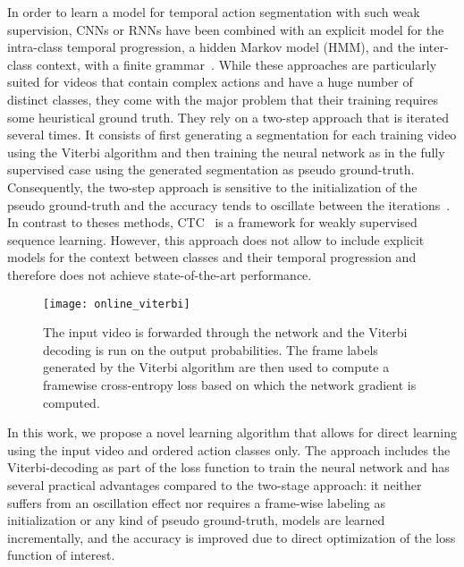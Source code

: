 \documentclass[10pt,twocolumn,letterpaper]{article}
\begin{document}
In order to learn a model for temporal action segmentation with such weak supervision, CNNs or RNNs have been combined 
with an explicit model for the intra-class temporal progression, \eg a hidden Markov model (HMM), and the
inter-class context, \eg with a finite grammar~\cite{richard2017weakly,koller2016deephand,koller2017resign}. While these approaches are particularly suited for videos that contain complex
actions and have a huge number of distinct classes, they come with the major problem
that their training requires some heuristical ground truth. They rely on a two-step approach that is iterated several times. It consists of first generating a segmentation for each training video using the Viterbi algorithm and then training the neural network as in the fully supervised case using the generated segmentation as pseudo ground-truth. Consequently, the two-step approach is sensitive to the initialization of the pseudo ground-truth and the accuracy tends to oscillate between the iterations~\cite{richard2017weakly}. In contrast to theses methods, CTC~\cite{graves2006connectionist} is a framework for weakly supervised sequence learning. However, this approach does not allow to include explicit models for the context between classes and their temporal progression and therefore does not achieve state-of-the-art performance.







\begin{figure}
    \centering
    \texttt{[image: online\_viterbi]}
    \caption{The input video  is forwarded through the network and the
             Viterbi decoding is run on the output probabilities. The frame labels generated
             by the Viterbi algorithm are then used to compute a framewise cross-entropy loss
             based on which the network gradient is computed.}
    \label{fig:onlineViterbi}
\end{figure}

In this work, we propose a novel learning algorithm that allows for direct
learning using the input video and ordered action classes only. The approach includes the
Viterbi-decoding as part of the loss function to train the neural network and has several
practical advantages compared to the two-stage approach:
it neither suffers from an oscillation effect nor requires a frame-wise labeling as
initialization or any kind of pseudo ground-truth, models are learned incrementally,
and the accuracy is improved due to direct optimization of the loss function of interest.
\end{document}
